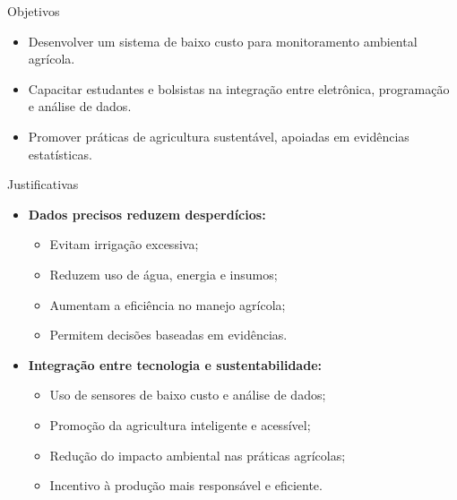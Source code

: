 \documentclass{beamer}
\begin{document}

\begin{frame}{Objetivos}
\begin{itemize}
    \item Desenvolver um sistema de baixo custo para monitoramento ambiental agrícola.
    \item Capacitar estudantes e bolsistas na integração entre eletrônica, programação e análise de dados.
    \item Promover práticas de agricultura sustentável, apoiadas em evidências estatísticas.
\end{itemize}
\end{frame}

\begin{frame}{Justificativas}
\begin{itemize}

    \item \textbf{Dados precisos reduzem desperdícios:}
    \begin{itemize}
        \item Evitam irrigação excessiva;
        \item Reduzem uso de água, energia e insumos;
        \item Aumentam a eficiência no manejo agrícola;
        \item Permitem decisões baseadas em evidências.
    \end{itemize}

    \item \textbf{Integração entre tecnologia e sustentabilidade:}
    \begin{itemize}
        \item Uso de sensores de baixo custo e análise de dados;
        \item Promoção da agricultura inteligente e acessível;
        \item Redução do impacto ambiental nas práticas agrícolas;
        \item Incentivo à produção mais responsável e eficiente.
    \end{itemize}

\end{itemize}
\end{frame}
\end{document}
